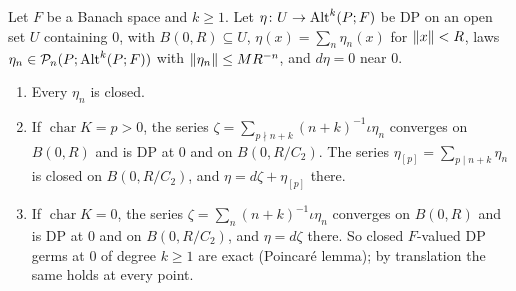 \begin{theorem}\label{dp:thm:weight-splitting}
Let $F$ be a Banach space and $k\ge1$. Let $\eta\colon U\to\operatorname{Alt}^k(P;F)$ be DP on an open set $U$ containing $0$, with $B(0,R)\subseteq U$, $\eta(x)=\sum_n\eta_n(x)$ for $\lVert x\rVert<R$, laws $\eta_n\in\mathcal P_n(P;\operatorname{Alt}^k(P;F))$ with $\lVert \eta_n\rVert\le MR^{-n}$, and $d\eta=0$ near $0$.
\begin{enumerate}
\item Every $\eta_n$ is closed.
\item If $\operatorname{char}K=p>0$, the series $\zeta=\sum_{p\nmid n+k}(n+k)^{-1}\iota\eta_n$ converges on $B(0,R)$ and is DP at $0$ and on $B(0,R/C_2)$. The series $\eta_{[p]}=\sum_{p\mid n+k}\eta_n$ is closed on $B(0,R/C_2)$, and $\eta=d\zeta+\eta_{[p]}$ there.
\item If $\operatorname{char}K=0$, the series $\zeta=\sum_n(n+k)^{-1}\iota\eta_n$ converges on $B(0,R)$ and is DP at $0$ and on $B(0,R/C_2)$, and $\eta=d\zeta$ there. So closed $F$-valued DP germs at $0$ of degree $k\ge1$ are exact (Poincar\'e lemma); by translation the same holds at every point.
\end{enumerate}
\end{theorem}

